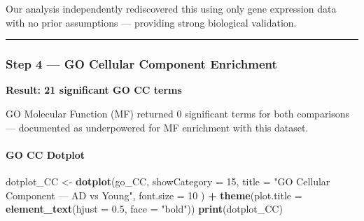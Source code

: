 \documentclass[
]{article}
\newenvironment{Shaded}{\begin{snugshade}}{\end{snugshade}}
\newcommand{\AttributeTok}[1]{\textcolor[rgb]{0.13,0.29,0.53}{#1}}
\newcommand{\ConstantTok}[1]{\textcolor[rgb]{0.56,0.35,0.01}{#1}}
\newcommand{\DecValTok}[1]{\textcolor[rgb]{0.00,0.00,0.81}{#1}}
\newcommand{\FloatTok}[1]{\textcolor[rgb]{0.00,0.00,0.81}{#1}}
\newcommand{\FunctionTok}[1]{\textcolor[rgb]{0.13,0.29,0.53}{\textbf{#1}}}
\newcommand{\NormalTok}[1]{#1}
\newcommand{\OtherTok}[1]{\textcolor[rgb]{0.56,0.35,0.01}{#1}}
\newcommand{\SpecialCharTok}[1]{\textcolor[rgb]{0.81,0.36,0.00}{\textbf{#1}}}
\newcommand{\StringTok}[1]{\textcolor[rgb]{0.31,0.60,0.02}{#1}}
\begin{document}
Our analysis independently rediscovered this using only gene expression
data with no prior assumptions --- providing strong biological
validation.

\begin{center}\rule{0.5\linewidth}{0.5pt}\end{center}

\subsubsection{Step 4 --- GO Cellular Component
Enrichment}\label{step-4-go-cellular-component-enrichment}

\begin{Shaded}
\end{Shaded}

\textbf{Result: 21 significant GO CC terms}

GO Molecular Function (MF) returned 0 significant terms for both
comparisons --- documented as underpowered for MF enrichment with this
dataset.

\paragraph{GO CC Dotplot}\label{go-cc-dotplot}

\begin{Shaded}
\begin{Highlighting}[]
\NormalTok{dotplot\_CC }\OtherTok{\textless{}{-}} \FunctionTok{dotplot}\NormalTok{(go\_CC,}
    \AttributeTok{showCategory =} \DecValTok{15}\NormalTok{,}
    \AttributeTok{title =} \StringTok{"GO Cellular Component — AD vs Young"}\NormalTok{,}
    \AttributeTok{font.size =} \DecValTok{10}
\NormalTok{) }\SpecialCharTok{+}
    \FunctionTok{theme}\NormalTok{(}\AttributeTok{plot.title =} \FunctionTok{element\_text}\NormalTok{(}\AttributeTok{hjust =} \FloatTok{0.5}\NormalTok{, }\AttributeTok{face =} \StringTok{"bold"}\NormalTok{))}
\FunctionTok{print}\NormalTok{(dotplot\_CC)}
\end{Highlighting}
\end{Shaded}
\end{document}
